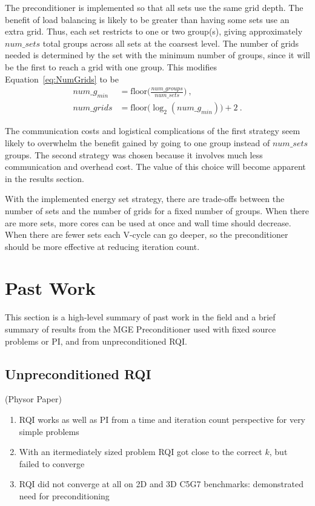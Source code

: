 \documentclass[preprint,12pt]{elsarticle}
\begin{document}
The preconditioner is implemented so that all sets use the same grid depth. The benefit of load balancing is likely to be greater than having some sets use an extra grid. Thus, each set restricts to one or two group(s), giving approximately $num\_sets$ total groups across all sets at the coarsest level. The number of grids needed is determined by the set with the minimum number of groups, since it will be the first to reach a grid with one group. This modifies Equation~\eqref{eq:NumGrids} to be
\begin{align}
  num\_g_{min} &= \text{floor}\bigl(\frac{num\_groups}{num\_sets}\bigr) \:, \\
  num\_grids &= \text{floor}\bigl( \log_{2}(num\_g_{min}) \bigr) + 2 \:.
  \label{eq:multisetGrids}
\end{align}

The communication costs and logistical complications of the first strategy seem likely to overwhelm the benefit gained by going to one group instead of $num\_sets$ groups. The second strategy was chosen because it involves much less communication and overhead cost. The value of this choice will become apparent in the results section. 

With the implemented energy set strategy, there are trade-offs between the number of sets and the number of grids for a fixed number of groups. When there are more sets, more cores can be used at once and wall time should decrease. When there are fewer sets each V-cycle can go deeper, so the preconditioner should be more effective at reducing iteration count.  


\section{Past Work}
This section is a high-level summary of past work in the field and a brief summary of results from the MGE Preconditioner used with fixed source problems or PI, and from unpreconditioned RQI.

\subsection{Unpreconditioned RQI}
(Physor Paper)
\begin{enumerate}
 \item RQI works as well as PI from a time and iteration count perspective for very simple problems
 \item With an itermediately sized problem RQI got close to the correct $k$, but failed to converge
 \item RQI did not converge at all on 2D and 3D C5G7 benchmarks: demonstrated need for preconditioning
\end{enumerate}
\end{document}
